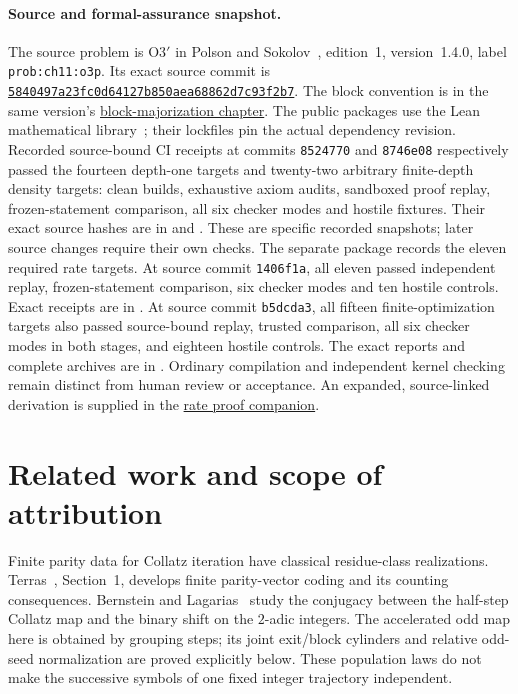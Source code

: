 \documentclass[11pt,letterpaper]{article}
\begin{document}
\paragraph{Source and formal-assurance snapshot.}
The source problem is O3$'$ in Polson and Sokolov~\cite{polson}, edition~1,
version~1.4.0, label \texttt{prob:ch11:o3p}. Its exact source commit is
\href{https://github.com/VadimSokolov/collatz/commit/5840497a23fc0d64127b850aea68862d7c93f2b7}{\nolinkurl{5840497a23fc0d64127b850aea68862d7c93f2b7}}.
The block convention is in the same version's
\href{https://github.com/VadimSokolov/collatz/blob/5840497a23fc0d64127b850aea68862d7c93f2b7/book/chapters/ch05c_mmcollatz.tex}{block-majorization chapter}.
The public packages use the Lean mathematical library~\cite{mathlib}; their
lockfiles pin the actual dependency revision. Recorded source-bound CI receipts
at commits \texttt{8524770} and \texttt{8746e08} respectively passed the fourteen
depth-one targets and twenty-two arbitrary finite-depth density targets:
clean builds, exhaustive axiom audits, sandboxed proof replay, frozen-statement
comparison, all six checker modes and hostile fixtures. Their exact source
hashes are in  and
. These are specific recorded snapshots;
later source changes require their own checks.
The separate  package records the eleven required
rate targets. At source commit \texttt{1406f1a}, all eleven passed independent
replay, frozen-statement comparison, six checker modes and ten hostile
controls. Exact receipts are in .
At source commit \texttt{b5dcda3}, all fifteen finite-optimization targets
also passed source-bound replay, trusted comparison, all six checker modes
in both stages, and eighteen hostile controls. The exact reports and complete
archives are in . Ordinary compilation and
independent kernel checking remain distinct from human review or acceptance.
An expanded, source-linked derivation is supplied in the
\href{../../lean/external_rate/RATE_PROOF.md}{rate proof companion}.

\section{Related work and scope of attribution}
Finite parity data for Collatz iteration have classical residue-class
realizations. Terras~\cite{terras}, Section~1, develops finite parity-vector
coding and its counting consequences. Bernstein and Lagarias~\cite{bernstein-lagarias}
study the conjugacy between the half-step Collatz map and the binary shift
on the $2$-adic integers. The accelerated odd map here is obtained by grouping
steps; its joint exit/block cylinders and relative odd-seed normalization are
proved explicitly below. These population laws do not make the successive
symbols of one fixed integer trajectory independent.
\end{document}

